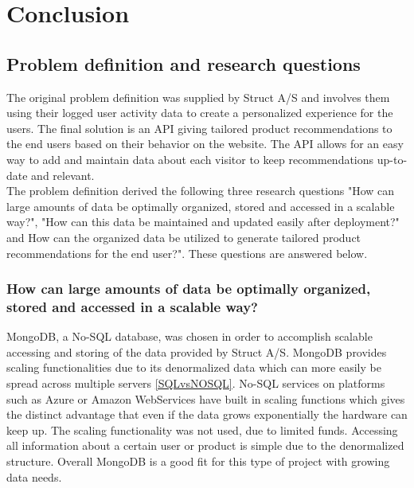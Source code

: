 
\chapter{Conclusion} %

\label{Chapter8} %


\section{Problem definition and research questions}

The original problem definition was supplied by Struct A/S and involves them using their logged user activity data to create a personalized experience for the users. The final solution is an API giving tailored product recommendations to the end users based on their behavior on the website. The API allows for an easy way to add and maintain data about each visitor to keep recommendations up-to-date and relevant. \\
The problem definition derived the following three research questions "How can large amounts of data be optimally organized, stored and accessed in a scalable way?",  "How can this data be maintained and updated easily after deployment?" and How can the organized data be utilized to generate tailored product recommendations for the end user?". These questions are answered below.

\subsection{How can large amounts of data be optimally organized, stored and accessed in a scalable way?}
MongoDB, a No-SQL database, was chosen in order to accomplish scalable accessing and storing of the data provided by Struct A/S. MongoDB provides scaling functionalities due to its denormalized data which can more easily be spread across multiple servers \ref{SQLvsNOSQL}. No-SQL services on platforms such as Azure or Amazon WebServices have built in scaling functions \cite{azureNoSQL} which gives the distinct advantage that even if the data grows exponentially the hardware can keep up. The scaling functionality was not used, due to limited funds. Accessing all information about a certain user or product is simple due to the denormalized structure. Overall MongoDB is a good fit for this type of project with growing data needs.

